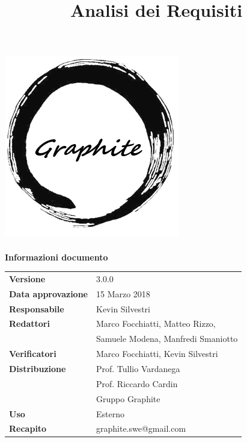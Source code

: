 \label{key}\documentclass[openany,12pt,a4paper]{report}
\title{Analisi dei Requisiti}
\author{}
\newcommand{\versione}{3.0.0}
\begin{document}
	
	\makeatletter
	\begin{titlepage}
		\setlength{\headsep}{0pt}  
		\begin{center}			
			\includegraphics[width=0.5\linewidth]{Logo.png}\\[1em]
			{\huge \bfseries  \@title }\\[10ex]
			\textbf{\Large Informazioni documento} \\[2em]
			\bgroup
			\def\arraystretch{1.5}
			\begin{tabular}{l|l}
				\textbf{Versione} & \versione{} \\
				\textbf{Data approvazione} & 15 Marzo 2018 \\
				\textbf{Responsabile} & Kevin Silvestri \\
				\textbf{Redattori} & Marco Focchiatti, Matteo Rizzo,\\
				& Samuele Modena, Manfredi Smaniotto \\
				\textbf{Verificatori} & Marco Focchiatti, Kevin Silvestri \\
				\textbf{Distribuzione} & Prof. Tullio Vardanega \\
				 & Prof. Riccardo Cardin \\
				 & Gruppo Graphite \\
				\textbf{Uso} & Esterno \\
				\textbf{Recapito} & graphite.swe@gmail.com \\
			\end{tabular}
		\egroup
		\end{center}
	\end{titlepage}
	\makeatother

	\thispagestyle{empty}
	\newpage
	
	
	
	\tableofcontents
	\listoffigures
	\listoftables
	
	
	
	
	
	
	
\end{document}
